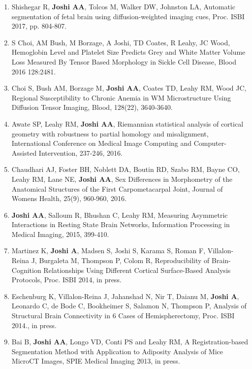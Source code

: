 \documentclass[overlapped,line,letterpaper]{res}
\begin{document}
\begin{resume}
\begin{enumerate}
    \item Shishegar R, \textbf{Joshi AA}, Tolcos M,  Walker DW, Johnston LA, Automatic segmentation of fetal brain using diffusion-weighted imaging cues, Proc. ISBI 2017, pp. 804-807.

    \item S Choi, AM Bush, M Borzage, A Joshi, TD Coates, R Leahy, JC Wood, {Hemoglobin Level and Platelet Size Predicts Grey and White Matter Volume Loss Measured By Tensor Based Morphology in Sickle Cell Disease}, Blood 2016 128:2481.

    \item Choi S, Bush AM, Borzage M, \textbf{Joshi AA}, Coates TD, Leahy RM, Wood JC, {Regional Susceptibility to Chronic Anemia in WM Microstructure Using Diffusion Tensor Imaging}, Blood, 128(22), 3640-3640. 

    \item Awate SP, Leahy RM, \textbf{Joshi AA}, {Riemannian statistical analysis of cortical geometry with robustness to partial homology and misalignment}, International Conference on Medical Image Computing and Computer-Assisted Intervention, 237-246, 2016.

    \item Chaudhari AJ, Foster BH, Noblett DA, Boutin RD, Szabo RM, Bayne CO, Leahy RM, Lane NE, \textbf{Joshi AA}, {Sex Differences in Morphometry of the Anatomical Structures of the First Carpometacarpal Joint}, Journal of Womens Health, 25(9), 960-960, 2016.

    \item \textbf{Joshi AA}, Salloum R, Bhushan C, Leahy RM, {Measuring Asymmetric Interactions in Resting State Brain Networks, Information Processing in Medical Imaging}, 2015, 399-410.


    \item Martinez K, \textbf{Joshi A}, Madsen S, Joshi S, Karama S, Roman F, Villalon-Reina J, Burgaleta M, Thompson P, Colom R, {Reproducibility of Brain-Cognition Relationships Using Different Cortical Surface-Based Analysis Protocols}, Proc. ISBI 2014, in press.

    \item Eschenburg K, Villalon-Reina J, Jahanshad N, Nir T, Daianu M, \textbf{Joshi A}, Leonardo C, de Bode C, Bookheimer S, Salamon N, Thompson P, {Analysis of Structural Brain Connectivity in 6 Cases of Hemispherectomy},  Proc. ISBI 2014., in press.


    \item Bai B, \textbf{Joshi AA}, Longo VD, Conti PS and Leahy RM, {A Registration-based Segmentation Method with Application to Adiposity Analysis of Mice MicroCT Images}, SPIE Medical Imaging 2013, in press.


\end{enumerate}
\end{resume}
\end{document}
